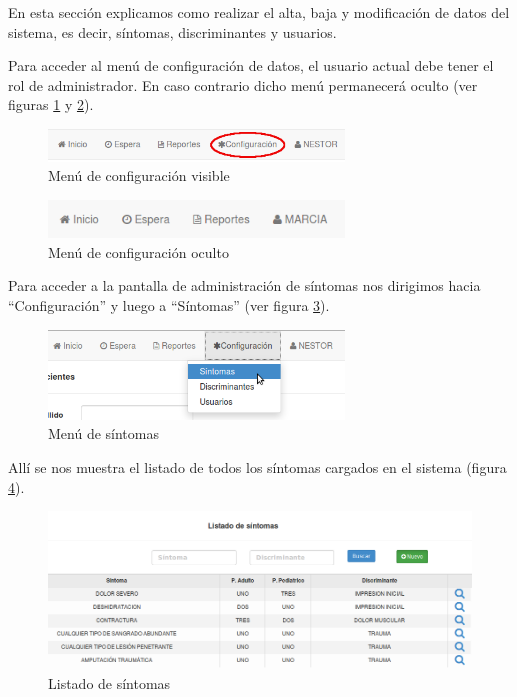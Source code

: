 En esta sección explicamos como realizar el alta, baja y modificación de datos del sistema, es decir, síntomas, discriminantes y usuarios.

Para acceder al menú de configuración de datos, el usuario actual debe tener el rol de administrador. En caso contrario dicho menú permanecerá oculto (ver figuras \ref{fig:menu_conf_visible} y \ref{fig:menu_conf_oculto}).

\begin{figure}
\centerline{\includegraphics[width=0.7\textwidth]{menu_configuracion_visible.png}}
\caption{Menú de configuración visible}
\label{fig:menu_conf_visible}
\end{figure}

\begin{figure}
\centerline{\includegraphics[width=0.7\textwidth]{menu_configuracion_oculto.png}}
\caption{Menú de configuración oculto}
\label{fig:menu_conf_oculto}
\end{figure}

Para acceder a la pantalla de administración de síntomas nos dirigimos hacia ``Configuración'' y luego a ``Síntomas'' (ver figura \ref{fig:menu_sintomas}).
\begin{figure}
\centerline{\includegraphics[width=0.7\textwidth]{menu_sintomas.png}}
\caption{Menú de síntomas}
\label{fig:menu_sintomas}
\end{figure}
Allí se nos muestra el listado de todos los síntomas cargados en el sistema (figura \ref{fig:listado_sintomas}).

\begin{figure}
\centerline{\includegraphics[width=1\textwidth]{listado_sintomas.png}}
\caption{Listado de síntomas}
\label{fig:listado_sintomas}
\end{figure}


